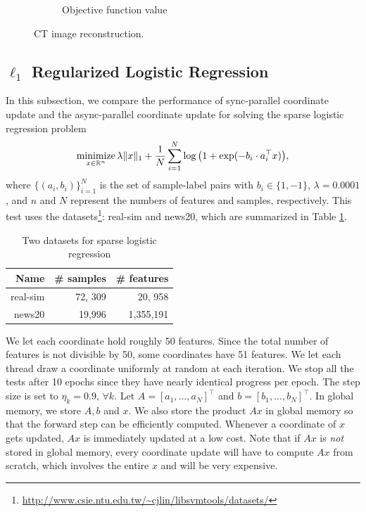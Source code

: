 \begin{figure}[!htb]
\begin{subfigure}{0.45\linewidth}
         \caption{Objective function value}\label{fig:pds_d}		                
    \end{subfigure} %
    \caption{CT image reconstruction.}
    \label{fig:pds_results}
\end{figure}


\subsection{$\ell_1$ Regularized Logistic Regression}
In this subsection, we compare the performance of sync-parallel coordinate update and the async-parallel coordinate update for solving the sparse logistic regression problem 
\begin{equation}\label{eqn:log}
\Min_{x \in \mathbb{R}^n} \lambda \|x\|_1 + \frac{1}{N} \sum_{i=1}^N \log\big(1 + \exp(-b_i \cdot a_i^{\top} x)\big),
\end{equation}
where $\{(a_i, b_i)\}_{i=1}^N$ is the set of sample-label pairs with $b_i \in \{1, -1\}$, $\lambda=0.0001$, and $n$ and $N$ represent the numbers of features and samples, respectively. This test uses the datasets\footnote{\url{http://www.csie.ntu.edu.tw/~cjlin/libsvmtools/datasets/}}: real-sim and news20, which are summarized in Table \ref{tab:log_data}.

\begin{table}[htbp]
\centering
 \caption{\label{tab:log_data}Two  datasets for  sparse logistic regression }
 \begin{tabular}{rrr}
\hline
  Name & \# samples & \# features \\
  \hline
 real-sim & 72, 309 & 20, 958 \\
  news20 & 19,996 & 1,355,191\\
  \hline
 \end{tabular}
\end{table}

We let each coordinate hold roughly 50 features. {Since the total number of features is not divisible by 50, some coordinates have 51 features.} We let each thread draw a coordinate uniformly at random at each iteration. We stop all the tests after 10 epochs since they have nearly identical progress per epoch. %
The step size is set to $\eta_k=0.9,\,\forall k$. Let $A = [a_1, \ldots, a_N]^{\top}$ and $b = [b_1, ..., b_N]^{\top}$. In global memory, we store $A, b$ and $x$. We also store the product $Ax$ in global memory so that the forward step can be efficiently computed. Whenever a coordinate of $x$ gets updated, $Ax$ is immediately updated at a low cost. Note that if $Ax$ is \emph{not} stored in global memory, every coordinate update will have to compute $Ax$ from scratch, which involves the entire $x$ and will be very expensive.  %

